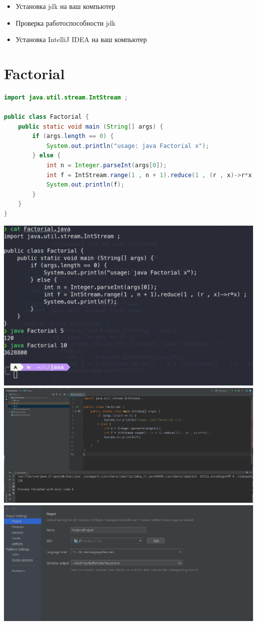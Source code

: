 \documentclass[12pt,a4paper,oneside,titlepage]{article}
\begin{document}
\begin{itemize}
  \item
        Установка jdk на ваш компьютер
  \item
        Проверка работоспособности jdk
  \item
        Установка IntelliJ IDEA на ваш компьютер
\end{itemize}

\section{Factorial}

\begin{lstlisting}[language=java]
import java.util.stream.IntStream ;

public class Factorial {
    public static void main (String[] args) {
        if (args.length == 0) {
            System.out.println("usage: java Factorial x");
        } else {
            int n = Integer.parseInt(args[0]);
            int f = IntStream.range(1 , n + 1).reduce(1 , (r , x)->r*x) ;
            System.out.println(f);
        }
    }
}
\end{lstlisting}

\includegraphics[width=\textwidth]{terminal}
\includegraphics[width=\textwidth]{intelliji}
\includegraphics[width=\textwidth]{settings}
\end{document}
